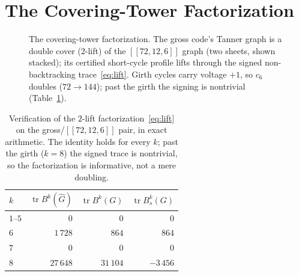 \documentclass[journal]{IEEEtran}
\DeclareMathOperator{\tr}{tr}
\begin{document}
\section{The Covering-Tower Factorization}
\label{sec:cover}

\begin{figure}[t]
\centering
{}
\caption{The covering-tower factorization. The gross code's Tanner graph is a double cover
($2$-lift) of the $[[72,12,6]]$ graph (two sheets, shown stacked); its certified short-cycle
profile lifts through the signed non-backtracking trace~\eqref{eq:lift}. Girth cycles carry
voltage $+1$, so $c_6$ doubles ($72\!\to\!144$); past the girth the signing is nontrivial
(Table~\ref{tab:lift}).}
\label{fig:cover}
\end{figure}

\begin{table}[t]
\caption{Verification of the $2$-lift factorization~\eqref{eq:lift} on the
gross/$[[72,12,6]]$ pair, in exact arithmetic. The identity holds for every $k$; past the
girth ($k=8$) the signed trace is nontrivial, so the factorization is informative, not a mere
doubling.}
\label{tab:lift}
\centering
\begin{tabular}{@{}lrrr@{}}
\toprule
$k$ & $\tr B^k(\widehat G)$ & $\tr B^k(G)$ & $\tr B_s^k(G)$ \\
\midrule
$1$--$5$ & $0$ & $0$ & $0$ \\
$6$ & $1\,728$ & $864$ & $864$ \\
$7$ & $0$ & $0$ & $0$ \\
$8$ & $27\,648$ & $31\,104$ & $-3\,456$ \\
\bottomrule
\end{tabular}
\end{table}
\end{document}
